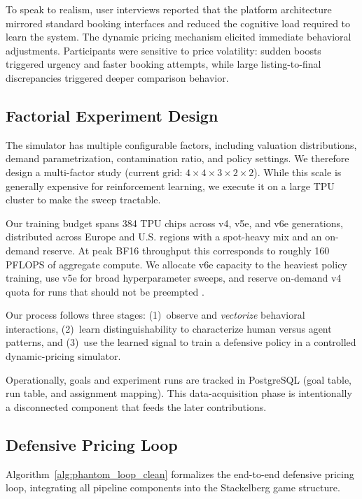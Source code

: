 \documentclass[sigconf]{acmart}
\begin{document}
To speak to realism, user interviews reported that the platform architecture mirrored standard booking interfaces and reduced the cognitive load required to learn the system. The dynamic pricing mechanism elicited immediate behavioral adjustments. Participants were sensitive to price volatility: sudden boosts triggered urgency and faster booking attempts, while large listing-to-final discrepancies triggered deeper comparison behavior.

\subsection{Factorial Experiment Design}

The simulator has multiple configurable factors, including valuation distributions, demand parametrization, contamination ratio, and policy settings. We therefore design a multi-factor study (current grid: $4\times4\times3\times2\times2$). While this scale is generally expensive for reinforcement learning, we execute it on a large TPU cluster to make the sweep tractable.

Our training budget spans 384 TPU chips across v4, v5e, and v6e generations, distributed across Europe and U.S. regions with a spot-heavy mix and an on-demand reserve. At peak BF16 throughput this corresponds to roughly 160 PFLOPS of aggregate compute. We allocate v6e capacity to the heaviest policy training, use v5e for broad hyperparameter sweeps, and reserve on-demand v4 quota for runs that should not be preempted \parencite{noauthor_tpu_2026,noauthor_tpu_2025-1,noauthor_tpu_2025}.

Our process follows three stages: (1)~observe and \textit{vectorize} behavioral interactions, (2)~learn distinguishability to characterize human versus agent patterns, and (3)~use the learned signal to train a defensive policy in a controlled dynamic-pricing simulator.

Operationally, goals and experiment runs are tracked in PostgreSQL (goal table, run table, and assignment mapping). This data-acquisition phase is intentionally a disconnected component that feeds the later contributions.

\subsection{Defensive Pricing Loop}

Algorithm~\ref{alg:phantom_loop_clean} formalizes the end-to-end defensive pricing loop, integrating all pipeline components into the Stackelberg game structure.
\end{document}
